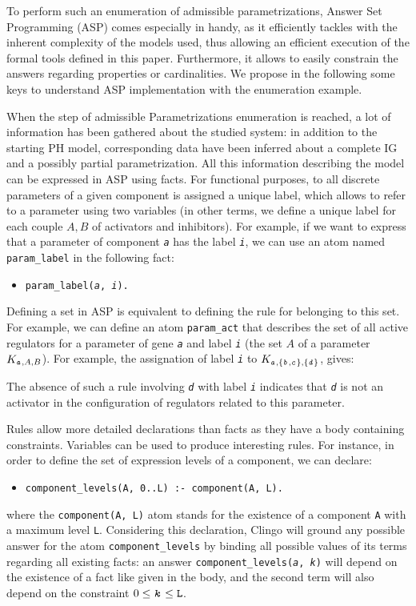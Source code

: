 \newcommand{\ti}[1]{\texttt{\textit{#1}}}
\newcommand{\aspil}[1]{\texttt{#1}}
\newcommand{\asp}[1]{\begin{itemize} \item[] \aspil{#1} \end{itemize}}

To perform such an enumeration of admissible parametrizations, Answer Set Programming (ASP) \cite{Baral03} comes especially in handy, as it efficiently tackles with the inherent complexity of the models used, thus allowing an efficient execution of the formal tools defined in this paper.
Furthermore, it allows to easily constrain the answers regarding properties or cardinalities.
We propose in the following some keys to understand ASP implementation with the enumeration example.

When the step of admissible Parametrizations enumeration is reached, a lot of information has been gathered about the studied system: in addition to the starting PH model, corresponding data have been inferred about a complete IG and a possibly partial parametrization.
All this information describing the model can be expressed in ASP using facts.
For functional purposes, to all discrete parameters of a given component is assigned a unique label, which allows to refer to a parameter using two variables (in other terms, we define a unique label for each couple $A,B$ of activators and inhibitors).
For example, if we want to express that a parameter of component \ti{a} has the label \ti{i}, we can use an atom named \aspil{param\_label} in the following fact:
\asp{param\_label(\ti{a}, \ti{i}).}

Defining a set in ASP is equivalent to defining the rule for belonging to this set. For example, we can define an atom \aspil{param\_act} that describes the set of all active regulators for a parameter of gene \ti{a} and label \ti{i} (\ie the set $A$ of a parameter $K_{\ti{a},A,B}$). For example, the assignation of label \ti{i} to $K_{\ti{a},\{\ti{b},\ti{c}\},\{\ti{d}\}}$, gives:
\asp{param\_act(\ti{a}, \ti{i}, \ti{b}). \item[] param\_act(\ti{a}, \ti{i}, \ti{c}).}
The absence of such a rule involving \ti{d} with label \ti{i} indicates that \ti{d} is not an activator in the configuration of regulators related to this parameter.

Rules allow more detailed declarations than facts as they have a body containing constraints. Variables can be used to produce interesting rules.
For instance, in order to define the set of expression levels of a component, we can declare:
\asp{component\_levels(A, 0..L) :- component(A, L).}
where the \aspil{component(A, L)} atom stands for the existence of a component \aspil{A} with a maximum level \aspil{L}.
Considering this declaration, Clingo will ground any possible answer for the atom \aspil{component\_levels} by binding all possible values of its terms regarding all existing facts: an answer \aspil{component\_levels(\ti{a}, \ti{k})} will depend on the existence of a fact like given in the body, and the second term will also depend on the constraint $0 \leq \ti{k} \leq \aspil{L}$.

